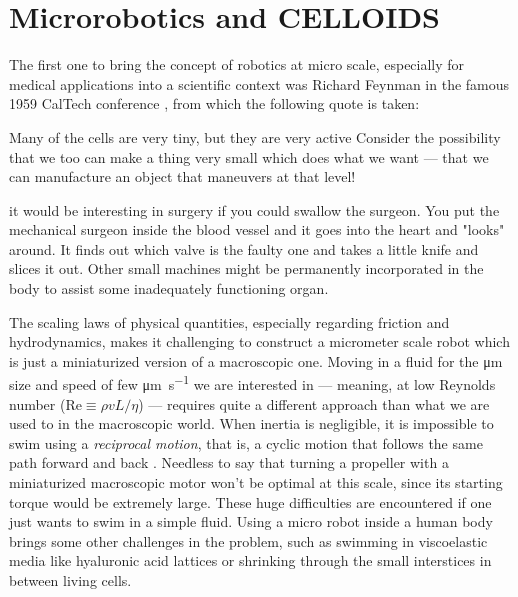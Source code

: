 \documentclass[../../master_thesis_np.tex]{subfiles}
\begin{document}
	
	\section{Microrobotics and CELLOIDS}

	The first one to bring the concept of robotics at micro scale, especially for medical applications into a scientific context was Richard Feynman in the famous 1959 CalTech conference  \cite{Feynman}, from which the following quote is taken:
	\begin{displayquote}
		Many of the cells are very tiny, but they are very active \omissis Consider the possibility that we too can make a thing very small which does what we want — that we can manufacture an object that maneuvers at that level!
		
		\omissis it would be interesting in surgery if you could swallow the surgeon. You put the mechanical surgeon inside the blood vessel and it goes into the heart and "looks" around. \omissis It finds out which valve is the faulty one and takes a little knife and slices it out. Other small machines might be permanently incorporated in the body to assist some inadequately functioning organ.
	\end{displayquote}
	The scaling laws of physical quantities, especially regarding friction and hydrodynamics, makes it challenging to construct a micrometer scale robot which is just a miniaturized version of a macroscopic one.
	Moving in a fluid for the \unit{\um} size and speed of few \unit{\um \per \second} we are interested in --- meaning, at low Reynolds number ($\mathrm{Re} \equiv \rho v L/\eta$) --- requires quite a different approach than what we are used to in the macroscopic world.
	When inertia is negligible, it is impossible to swim using a \emph{reciprocal motion}, that is, a cyclic motion that follows the same path forward and back \cite{purcell_life_1977}. 
	Needless to say that turning a propeller with a miniaturized macroscopic motor won't be optimal at this scale, since its starting torque would be extremely large. 
	These huge difficulties are encountered if one just wants to swim in a simple fluid. 
	Using a micro robot inside a human body brings some other challenges in the problem, such as swimming in viscoelastic media like hyaluronic acid lattices or shrinking through the small interstices in between living cells. 
\end{document}
